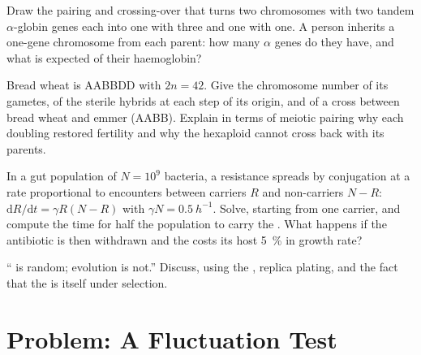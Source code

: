 \begin{exercise}[$\star\star$]\label{exo:b2:genome-diversification:9}
Draw the pairing and crossing-over that turns two chromosomes with
two tandem $\alpha$-globin genes each into one with three and one
with one. A person inherits a one-gene chromosome from each parent:
how many $\alpha$ genes do they have, and what is expected of their
haemoglobin?
\end{exercise}

\begin{exercise}[$\star\star\star$]\label{exo:b2:genome-diversification:10}
Bread wheat is AABBDD with $2n = 42$. Give the chromosome number of
its gametes, of the sterile hybrids at each step of its origin, and
of a cross between bread wheat and emmer (AABB). Explain in terms of
meiotic pairing why each doubling restored fertility and why the
hexaploid cannot cross back with its parents.
\end{exercise}

\begin{exercise}[$\star\star\star$]\label{exo:b2:genome-diversification:11}
In a gut population of $N = 10^{9}$ bacteria, a resistance 
spreads by conjugation at a rate proportional to encounters between
carriers $R$ and non-carriers $N - R$: $\mathrm{d}R/\mathrm{d}t =
\gamma R (N - R)$ with $\gamma N = \qty{0.5}{h^{-1}}$. Solve, starting
from one carrier, and compute the time for half the population to
carry the . What happens if the antibiotic is then withdrawn
and the  costs its host \qty{5}{\%} in growth rate?
\end{exercise}

\begin{exercise}[$\star\star\star$]\label{exo:b2:genome-diversification:12}
`` is random; evolution is not.'' Discuss, using the
, replica plating, and the fact that the  is itself under selection.
\end{exercise}

\section{Problem: A Fluctuation Test}

